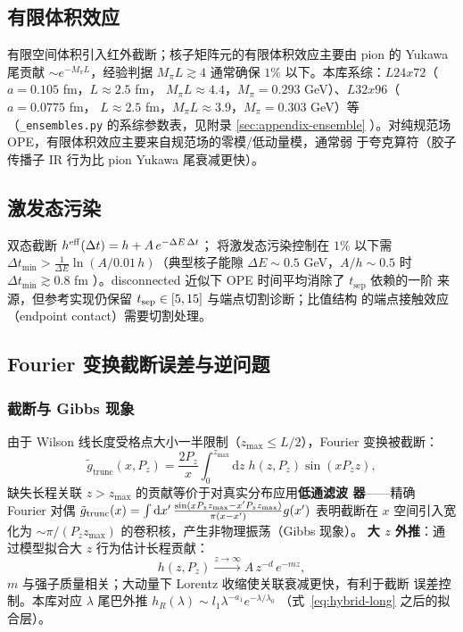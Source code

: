 \documentclass[11pt,a4paper]{ctexart}
\newcommand{\code}[1]{\texttt{#1}}
\begin{document}
\subsection{有限体积效应}

有限空间体积引入红外截断；核子矩阵元的有限体积效应主要由 pion 的
Yukawa 尾贡献 $\sim e^{-M_\pi L}$，经验判据 $M_\pi L\gtrsim4$ 通常确保
$1\%$ 以下。本库系综：$L24x72$（$a=0.105$ fm，$L\approx2.5$ fm，
$M_\pi L\approx4.4$，$M_\pi=0.293$ GeV）、$L32x96$（$a=0.0775$ fm，
$L\approx2.5$ fm，$M_\pi L\approx3.9$，$M_\pi=0.303$ GeV）等
（\code{\_ensembles.py} 的系综参数表，见附录 \ref{sec:appendix-ensemble}
）。对纯规范场 OPE，有限体积效应主要来自规范场的零模/低动量模，通常弱
于夸克算符（胶子传播子 IR 行为比 pion Yukawa 尾衰减更快）。

\subsection{激发态污染}

双态截断 $h^{\rm eff}(\Delta t)=h+A\,e^{-\Delta E\,\Delta t}$；
将激发态污染控制在 $1\%$ 以下需
$\Delta t_{\min}>\frac{1}{\Delta E}\ln(A/0.01\,h)$（典型核子能隙
$\Delta E\sim0.5$ GeV，$A/h\sim0.5$ 时 $\Delta t_{\min}\gtrsim0.8$ fm
）。disconnected 近似下 OPE 时间平均消除了 $t_{\text{sep}}$ 依赖的一阶
来源，但参考实现仍保留 $t_{\rm sep}\in[5,15]$ 与端点切割诊断；比值结构
的端点接触效应（endpoint contact）需要切割处理。

\subsection{Fourier 变换截断误差与逆问题}

\subsubsection{截断与 Gibbs 现象}

由于 Wilson 线长度受格点大小一半限制（$z_{\max}\le L/2$），Fourier
变换被截断：
\begin{equation}
\tilde{g}_{\text{trunc}}(x, P_z) = \frac{2P_z}{x}
\int_{0}^{z_{\max}} \mathrm{d}z \; h(z, P_z) \sin(x P_z z),
\end{equation}
缺失长程关联 $z>z_{\max}$ 的贡献等价于对真实分布应用\textbf{低通滤波
器}——精确 Fourier 对偶 $\tilde g_{\rm trunc}(x)
=\int\mathrm{d}x'\,\frac{\sin(xP_zz_{\max}-x'P_zz_{\max})}
{\pi(x-x')}g(x')$ 表明截断在 $x$ 空间引入宽化为
$\sim\pi/(P_zz_{\max})$ 的卷积核，产生非物理振荡（Gibbs 现象）。
\textbf{大 $z$ 外推}：通过模型拟合大 $z$ 行为估计长程贡献：
\begin{equation}\label{eq:largez-model}
h(z, P_z) \xrightarrow{z \to \infty} A\,z^{-d}\,e^{-m z},
\end{equation}
$m$ 与强子质量相关；大动量下 Lorentz 收缩使关联衰减更快，有利于截断
误差控制。本库对应 $\lambda$ 尾巴外推
$h_R(\lambda)\sim l_1\lambda^{-a_1}e^{-\lambda/\lambda_0}$
（式~\eqref{eq:hybrid-long} 之后的拟合层）。
\end{document}
